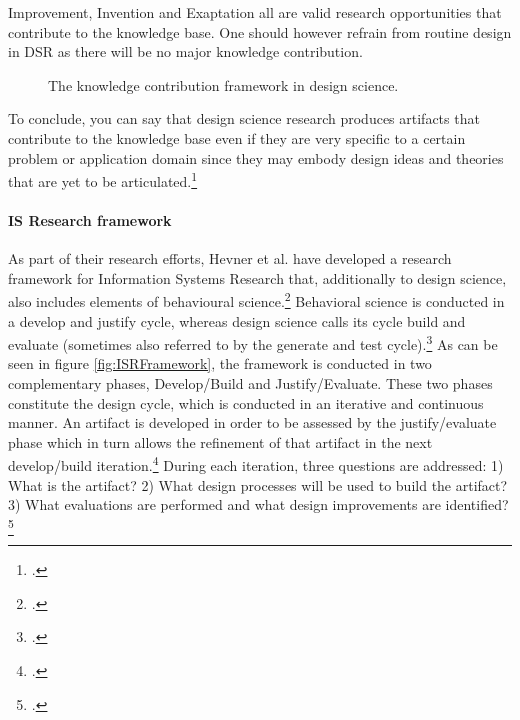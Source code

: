 Improvement, Invention and Exaptation all are valid research opportunities that contribute to the knowledge base. One should however refrain from routine design in DSR as there will be no major knowledge contribution.

\begin{figure}
    \centering
    
    \caption[The knowledge contribution framework in design science.]{The knowledge contribution framework in design science.\footnotemark}
    \label{fig:DSRKnowledgeContribution}
\end{figure}

To conclude, you can say that design science research produces artifacts that contribute to the knowledge base even if they are very specific to a certain problem or application domain since they may embody design ideas and theories that are yet to be articulated.\footcite[Cf.][p.340]{GregorPositioningpresentingdesign2013}


\paragraph{IS Research framework}  \label{topic:design cycle}
As part of their research efforts, Hevner et al. have developed a research framework for Information Systems Research that, additionally to design science, also includes elements of behavioural science.\footcite[Cf.][p.80]{HevnerDesignScienceResearch2004} Behavioral science is conducted in a develop and justify cycle, whereas design science calls its cycle build and evaluate (sometimes also referred to by the generate and test cycle).\footcite[Cf.][p.80,89]{HevnerDesignScienceResearch2004}
As can be seen in figure \ref{fig:ISRFramework}, the framework is conducted in two complementary phases, Develop/Build and Justify/Evaluate. These two phases constitute the design cycle, which is conducted in an iterative and continuous manner. An artifact is developed in order to be assessed by the justify/evaluate phase which in turn allows the refinement of that artifact in the next develop/build iteration.\footcite[Cf.][p.19]{HevnerDesignResearchInformation2010} During each iteration, three questions are addressed: 1) What is the artifact? 2) What design processes will be used to build the artifact? 3) What evaluations are performed and what design improvements are identified?\footcites[Cf.][p.19]{HevnerDesignResearchInformation2010}[cf.][p.90]{Hevnerthreecycleview2007} 

